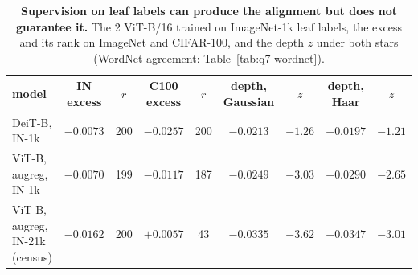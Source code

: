 \begin{table}[H]
\centering
\scriptsize
\setlength{\tabcolsep}{2.2pt}
\begingroup
\setlength{\tabcolsep}{4pt}
\begin{tabular}{lcccccccc}
\toprule
model & IN excess & $r$ & C100 excess & $r$ & depth, Gaussian & $z$ & depth, Haar & $z$ \\
\midrule
DeiT-B, IN-1k & $-0.0073$ & 200 & $-0.0257$ & 200 & $-0.0213$ & $-1.26$ & $-0.0197$ & $-1.21$ \\
ViT-B, augreg, IN-1k & $-0.0070$ & 199 & $-0.0117$ & 187 & $-0.0249$ & $-3.03$ & $-0.0290$ & $-2.65$ \\
ViT-B, augreg, IN-21k (census) & $-0.0162$ & 200 & $+0.0057$ & 43 & $-0.0335$ & $-3.62$ & $-0.0347$ & $-3.01$ \\
\bottomrule
\end{tabular}
\par\vspace{2pt}
\endgroup
\caption{\textbf{Supervision on leaf labels can produce the alignment but does not guarantee it.} The 2 ViT-B/16 trained on ImageNet-1k leaf labels, the excess and its rank on ImageNet and CIFAR-100, and the depth $z$ under both stars (WordNet agreement: Table~\ref{tab:q7-wordnet}).
}
\label{tab:q4-depth-b}
\end{table}
